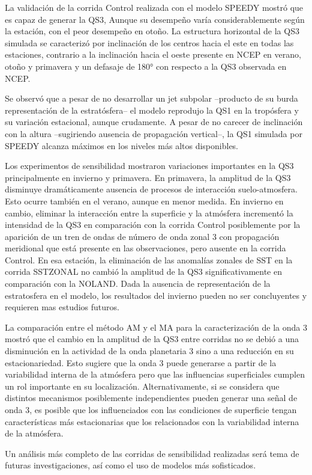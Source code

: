 \documentclass[spanish,a4paper,12pt,oneside]{book}
\begin{document}
La validación de la corrida Control realizada con el modelo SPEEDY
mostró que es capaz de generar la QS3, Aunque su desempeño varía
considerablemente según la estación, con el peor desempeño en otoño. La
estructura horizontal de la QS3 simulada se caracterizó por inclinación
de los centros hacia el este en todas las estaciones, contrario a la
inclinación hacia el oeste presente en NCEP en verano, otoño y primavera
y un defasaje de 180° con respecto a la QS3 observada en NCEP.

Se observó que a pesar de no desarrollar un jet subpolar --producto de
su burda representación de la estratósfera-- el modelo reprodujo la QS1
en la tropósfera y su variación estacional, aunque crudamente. A pesar
de no carecer de inclinación con la altura --sugiriendo ausencia de
propagación vertical--, la QS1 simulada por SPEEDY alcanza máximos en
los niveles más altos disponibles.

Los experimentos de sensibilidad mostraron variaciones importantes en la
QS3 principalmente en invierno y primavera. En primavera, la amplitud de
la QS3 disminuye dramáticamente ausencia de procesos de interacción
suelo-atmosfera. Esto ocurre también en el verano, aunque en menor
medida. En invierno en cambio, eliminar la interacción entre la
superficie y la atmósfera incrementó la intensidad de la QS3 en
comparación con la corrida Control posiblemente por la aparición de un
tren de ondas de número de onda zonal 3 con propagación meridional que
está presente en las observaciones, pero ausente en la corrida Control.
En esa estación, la eliminación de las anomalías zonales de SST en la
corrida SSTZONAL no cambió la amplitud de la QS3 significativamente en
comparación con la NOLAND. Dada la ausencia de representación de la
estratosfera en el modelo, los resultados del invierno pueden no ser
concluyentes y requieren mas estudios futuros.

La comparación entre el método AM y el MA para la caracterización de la
onda 3 mostró que el cambio en la amplitud de la QS3 entre corridas no
se debió a una disminución en la actividad de la onda planetaria 3 sino
a una reducción en su estacionariedad. Esto sugiere que la onda 3 puede
generarse a partir de la variabilidad interna de la atmósfera pero que
las influencias superficiales cumplen un rol importante en su
localización. Alternativamente, si se considera que distintos mecanismos
posiblemente independientes pueden generar una señal de onda 3, es
posible que los influenciados con las condiciones de superficie tengan
características más estacionarias que los relacionados con la
variabilidad interna de la atmósfera.

Un análisis más completo de las corridas de sensibilidad realizadas será
tema de futuras investigaciones, así como el uso de modelos más
sofisticados.

\printbibliography[title=Referencias]
\end{document}
